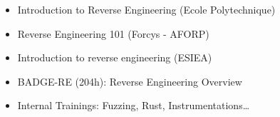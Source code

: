 \twocolumnsection
{
\begin{itemize}
	\item Introduction to Reverse Engineering (Ecole Polytechnique)
	\item Reverse Engineering 101 (Forcys - AFORP)
	\item Introduction to reverse engineering (ESIEA)
\end{itemize}
}
{
\vspace{1em}
\begin{itemize}
	\item BADGE-RE (204h): Reverse Engineering Overview
	\item Internal Trainings: Fuzzing, Rust, Instrumentations\ldots
\end{itemize}
}
